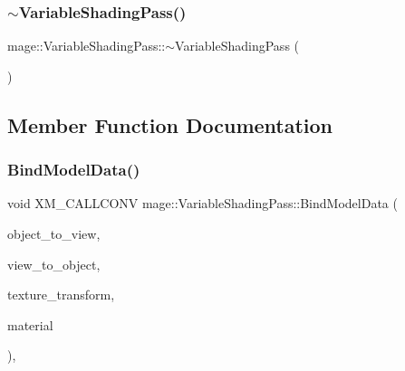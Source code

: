 \hypertarget{classmage_1_1_variable_shading_pass_a1af7915285b239e8e6d14eb0f926dc4a}{}\label{classmage_1_1_variable_shading_pass_a1af7915285b239e8e6d14eb0f926dc4a} 
\subsubsection{\texorpdfstring{$\sim$\+Variable\+Shading\+Pass()}{~VariableShadingPass()}}
{\footnotesize\ttfamily mage\+::\+Variable\+Shading\+Pass\+::$\sim$\+Variable\+Shading\+Pass (\begin{DoxyParamCaption}{ }\end{DoxyParamCaption})\hspace{0.3cm}{\ttfamily [default]}}



\subsection{Member Function Documentation}
\hypertarget{classmage_1_1_variable_shading_pass_a4b86358d453ff6cf1c89b1b3894ab30f}{}\label{classmage_1_1_variable_shading_pass_a4b86358d453ff6cf1c89b1b3894ab30f} 
\subsubsection{\texorpdfstring{Bind\+Model\+Data()}{BindModelData()}}
{\footnotesize\ttfamily void X\+M\+\_\+\+C\+A\+L\+L\+C\+O\+NV mage\+::\+Variable\+Shading\+Pass\+::\+Bind\+Model\+Data (\begin{DoxyParamCaption}\item[{F\+X\+M\+M\+A\+T\+R\+IX}]{object\+\_\+to\+\_\+view,  }\item[{F\+X\+M\+M\+A\+T\+R\+IX}]{view\+\_\+to\+\_\+object,  }\item[{F\+X\+M\+M\+A\+T\+R\+IX}]{texture\+\_\+transform,  }\item[{const \hyperlink{structmage_1_1_material}{Material} $\ast$}]{material }\end{DoxyParamCaption})\hspace{0.3cm}{\ttfamily [private]}, {\ttfamily [noexcept]}}

